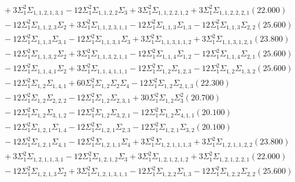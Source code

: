 \documentclass[12pt]{article}
\begin{document}
\begin{landscape}
\begin{align*}
		&\quad\quad +3\Sigma_{1}^{2}\Sigma_{1,1,2,1,3,1}-12\Sigma_{1}^{2}\Sigma_{1,1,2,2}\Sigma_{3}+3\Sigma_{1}^{2}\Sigma_{1,1,2,2,1,2}+3\Sigma_{1}^{2}\Sigma_{1,1,2,2,2,1}(22.000) \\ 
		&\quad\quad -12\Sigma_{1}^{2}\Sigma_{1,1,2,3}\Sigma_{2}+3\Sigma_{1}^{2}\Sigma_{1,1,2,3,1,1}-12\Sigma_{1}^{2}\Sigma_{1,1,3}\Sigma_{1,3}-12\Sigma_{1}^{2}\Sigma_{1,1,3}\Sigma_{2,2}(25.600) \\ 
		&\quad\quad -12\Sigma_{1}^{2}\Sigma_{1,1,3}\Sigma_{3,1}-12\Sigma_{1}^{2}\Sigma_{1,1,3,1}\Sigma_{3}+3\Sigma_{1}^{2}\Sigma_{1,1,3,1,1,2}+3\Sigma_{1}^{2}\Sigma_{1,1,3,1,2,1}(23.800) \\ 
		&\quad\quad -12\Sigma_{1}^{2}\Sigma_{1,1,3,2}\Sigma_{2}+3\Sigma_{1}^{2}\Sigma_{1,1,3,2,1,1}-12\Sigma_{1}^{2}\Sigma_{1,1,4}\Sigma_{1,2}-12\Sigma_{1}^{2}\Sigma_{1,1,4}\Sigma_{2,1}(25.600) \\ 
		&\quad\quad -12\Sigma_{1}^{2}\Sigma_{1,1,4,1}\Sigma_{2}+3\Sigma_{1}^{2}\Sigma_{1,1,4,1,1,1}-12\Sigma_{1}^{2}\Sigma_{1,2}\Sigma_{1,2,3}-12\Sigma_{1}^{2}\Sigma_{1,2}\Sigma_{1,3,2}(25.600) \\ 
		&\quad\quad -12\Sigma_{1}^{2}\Sigma_{1,2}\Sigma_{1,4,1}+60\Sigma_{1}^{2}\Sigma_{1,2}\Sigma_{2}\Sigma_{4}-12\Sigma_{1}^{2}\Sigma_{1,2}\Sigma_{2,1,3}(22.300) \\ 
		&\quad\quad -12\Sigma_{1}^{2}\Sigma_{1,2}\Sigma_{2,2,2}-12\Sigma_{1}^{2}\Sigma_{1,2}\Sigma_{2,3,1}+30\Sigma_{1}^{2}\Sigma_{1,2}\Sigma_{3}^{2}(20.700) \\ 
		&\quad\quad -12\Sigma_{1}^{2}\Sigma_{1,2}\Sigma_{3,1,2}-12\Sigma_{1}^{2}\Sigma_{1,2}\Sigma_{3,2,1}-12\Sigma_{1}^{2}\Sigma_{1,2}\Sigma_{4,1,1}(20.100) \\ 
		&\quad\quad -12\Sigma_{1}^{2}\Sigma_{1,2,1}\Sigma_{1,4}-12\Sigma_{1}^{2}\Sigma_{1,2,1}\Sigma_{2,3}-12\Sigma_{1}^{2}\Sigma_{1,2,1}\Sigma_{3,2}(20.100) \\ 
		&\quad\quad -12\Sigma_{1}^{2}\Sigma_{1,2,1}\Sigma_{4,1}-12\Sigma_{1}^{2}\Sigma_{1,2,1,1}\Sigma_{4}+3\Sigma_{1}^{2}\Sigma_{1,2,1,1,1,3}+3\Sigma_{1}^{2}\Sigma_{1,2,1,1,2,2}(23.800) \\ 
		&\quad\quad +3\Sigma_{1}^{2}\Sigma_{1,2,1,1,3,1}-12\Sigma_{1}^{2}\Sigma_{1,2,1,2}\Sigma_{3}+3\Sigma_{1}^{2}\Sigma_{1,2,1,2,1,2}+3\Sigma_{1}^{2}\Sigma_{1,2,1,2,2,1}(22.000) \\ 
		&\quad\quad -12\Sigma_{1}^{2}\Sigma_{1,2,1,3}\Sigma_{2}+3\Sigma_{1}^{2}\Sigma_{1,2,1,3,1,1}-12\Sigma_{1}^{2}\Sigma_{1,2,2}\Sigma_{1,3}-12\Sigma_{1}^{2}\Sigma_{1,2,2}\Sigma_{2,2}(25.600) \\ 

\end{align*}
\end{landscape}
\end{document}
